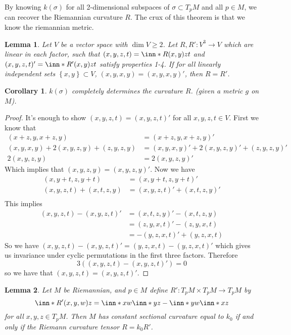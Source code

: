 \documentclass[a4paper]{article}
\newtheorem*{cor}{Corollary}
\newtheorem*{lem}{Lemma}
\begin{document}
By knowing $k(\sigma)$ for all 2-dimensional subspaces of $\sigma \subset T_pM$ and all $p \in M$, we can recover the Riemannian curvature $R$. The crux of this theorem is that we know the riemannian metric.

\begin{lem}
  Let $V$ be a vector space with $\dim V \geq 2$. Let $R, R' : V^3 \rightarrow V$ which are linear in each factor, such that $(x,y,z,t) = \inn*{R(x,y)z}{t}$ and $(x,y,z,t)' = \inn*{R'(x,y)z}{t}$ satisfy properties 1-4. If for all linearly independent sets $\left\{ x,y \right\} \subset V$, $(x,y,x,y) = (x,y,x,y)'$, then $R = R'$.
\end{lem}

\begin{cor}
  $k(\sigma)$ completely determines the curvature $R$. (given a metric $g$ on $M$).
\end{cor}

\begin{proof}
  It's enough to show $(x,y,z,t) = (x,y,z,t)'$ for all $x,y,z,t \in V$. First we know that 
  \[
    \begin{aligned}
      (x+z,y, x+z,y) &= (x+z,y,x+z,y)' \\
      (x,y,x,y) + 2(x,y,z,y) + (z,y,z,y) &=(x,y,x,y)' + 2(x,y,z,y)' + (z,y,z,y)' \\
      2(x,y,z,y) &= 2(x,y,z,y)'
    \end{aligned}
  \]
  Which implies that $(x,y,z,y) = (x,y,z,y)'$. Now we have
  \[
    \begin{aligned}
      (x,y+t,z,y+t) &= (x,y+t, z, y+t)' \\
      (x,y,z,t) + (x,t,z,y) &= (x,y,z,t)' + (x,t,z,y)' \\
    \end{aligned}
  \]
  This implies 
  \[
    \begin{aligned}
      (x,y,z,t) - (x,y,z,t)'  &= (x,t,z,y)' - (x,t,z,y) \\
                              &= (z,y,x,t)' - (z,y,x,t) \\
                              &= -(y,z,x,t)' + (y,z,x,t)
    \end{aligned}
  \]
  So we have $(x,y,z,t) - (x,y,z,t)' = (y,z,x,t) - (y,z,x,t)'$ which gives us invariance under cyclic permutations in the first three factors. Therefore 
  \[
    3 \left( (x,y,z,t) - (x,y,z,t)' \right) = 0
  \]
  so we have that $(x,y,z,t) = (x,y,z,t)'$.
\end{proof}

\begin{lem}
  Let $M$ be Riemannian, and $p \in M$ define $R': T_pM \times T_pM \rightarrow T_pM$ by
  \[
    \inn*{R'(x,y,w)}{z} = \inn*{x}{w}\inn*{y}{z} - \inn*{y}{w}\inn*{x}{z}
  \]
  for all $x,y,z \in T_pM$. Then $M$ has constant sectional curvature equal to $k_0$ if and only if the Riemann curvature tensor $R = k_0 R'$.
\end{lem}
\end{document}
